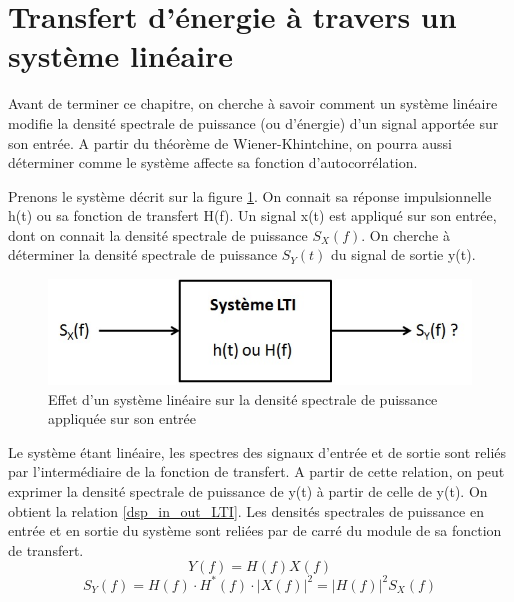 	


	\section{Transfert d'énergie à travers un système linéaire}
	Avant de terminer ce chapitre, on cherche à savoir comment un système linéaire modifie la densité spectrale de puissance (ou d'énergie) d'un signal apportée sur son entrée. A partir du théorème de Wiener-Khintchine, on pourra aussi déterminer comme le système affecte sa fonction d'autocorrélation.
	
	Prenons le système décrit sur la figure \ref{Fig:Syst_LTI_dsp}. On connait sa réponse impulsionnelle h(t) ou sa fonction de transfert H(f). Un signal x(t) est appliqué sur son entrée, dont on connait la densité spectrale de puissance $S_{X}(f)$. On cherche à déterminer la densité spectrale de puissance $S_{Y}(t)$ du signal de sortie y(t). 
	\begin{figure}[h!]
		\centering
		\includegraphics[scale=0.7]{images/Syst_LTI_dsp.jpg}
		\caption{Effet d'un système linéaire sur la densité spectrale de puissance appliquée sur son entrée}	
		\label{Fig:Syst_LTI_dsp} 
	\end{figure}
	
	Le système étant linéaire, les spectres des signaux d'entrée et de sortie sont reliés par l'intermédiaire de la fonction de transfert. A partir de cette relation, on peut exprimer la densité spectrale de puissance de y(t) à partir de celle de y(t). On obtient la relation \ref{dsp_in_out_LTI}. Les densités spectrales de puissance en entrée et en sortie du système sont reliées par de carré du module de sa fonction de transfert.
	\begin{equation*}
	Y(f)=H(f)X(f)
	\end{equation*} 
	\begin{equation}\label{dsp_in_out_LTI}
	S_{Y}(f)=H(f)\cdot H^{*}(f) \cdot |X(f)|^{2}=|H(f)|^{2}S_{X}(f)
	\end{equation}
	
